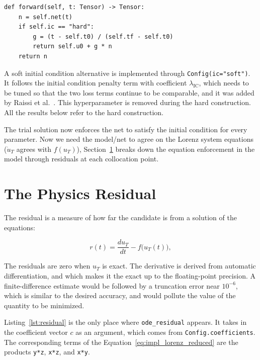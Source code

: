 \begin{lstlisting}[caption={The forward pass, implementing Equation~\ref{eq:trial}.}, label={lst:forward}]
def forward(self, t: Tensor) -> Tensor:
    n = self.net(t)
    if self.ic == "hard":
        g = (t - self.t0) / (self.tf - self.t0)
        return self.u0 + g * n
    return n
\end{lstlisting}

A soft initial condition alternative is implemented through \texttt{Config(ic="soft")}. It follows the initial condition penalty term with coefficient $\lambda_{\mathrm{IC}}$, which needs to be tuned so that the two loss terms continue to be comparable, and it was added by Raissi et al.\ \cite{raissi2019pinn}. This hyperparameter is removed during the hard construction. All the results below refer to the hard construction.

The trial solution now enforces the net to satisfy the initial condition for every parameter. Now we need the model/net to agree on the Lorenz system equations ($\dot{u}_T$ agrees with
$f(u_T)$), Section~\ref{sec:impl_residual} breaks down the equation enforcement in the model through residuals at each collocation point.

\section{The Physics Residual}
\label{sec:impl_residual}

The residual is a measure of how far the candidate is from a solution of the equations:

\begin{equation}
r(t) = \frac{du_T}{dt} - f\big(u_T(t)\big),
\label{eq:residual}
\end{equation}

The residuals are zero when $u_T$ is exact. The derivative is derived from automatic differentiation, and which makes it the exact up to the floating-point precision. A finite-difference estimate would be followed by a truncation error near $10^{-6}$, which is similar to the desired accuracy, and would pollute the value of the quantity to be minimized.

Listing~\ref{lst:residual} is the only place where \texttt{ode\_residual} appears. It takes in the coefficient vector $c$ as an argument, which comes from \texttt{Config.coefficients}. The corresponding terms of the Equation~\ref{eq:impl_lorenz_reduced} are the products \texttt{y*z}, \texttt{x*z}, and \texttt{x*y}. 

